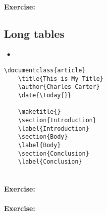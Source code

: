         \paragraph{Exercise:}

        \subsection{Long tables}
        \label{Long tables}
        
        \begin{framed}
            \begin{itemize}
                \item{}
            \end{itemize}
        \end{framed}


        \begin{verbatim}
\documentclass{article}
    \title{This is My Title}
    \author{Charles Carter}
    \date{\today{}}
 
    \maketitle{}
    \section{Introduction}
    \label{Introduction}
    \section{Body}
    \label{Body}
    \section{Conclusion}
    \label{Conclusion}
    
        \end{verbatim}

        \paragraph{Exercise:}

        \paragraph{Exercise:}


